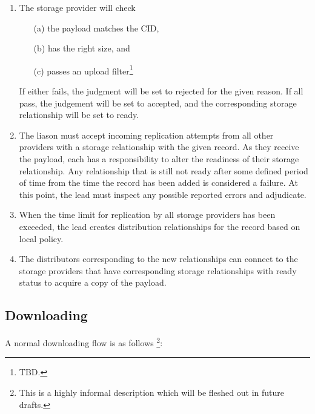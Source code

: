 \documentclass{article}
\begin{document}
\begin{enumerate}
\item
The storage provider will check

      \begin{itemize}

      \item[(a)] the payload matches the CID,

      \item[(b)] has the right size, and

      \item[(c)] passes an upload filter\footnote{TBD.}

      \end{itemize}

If either fails, the judgment will be set to rejected for the given reason. If all pass, the judgement will be set to accepted, and the corresponding storage relationship will be set to ready.

\item
The liason must accept incoming replication attempts from all other providers with a storage relationship with the given record. As they receive the payload, each has a responsibility to alter the readiness of their storage relationship. Any relationship that is still not ready after some defined period of time from the time the record has been added is considered a failure. At this point, the lead must inspect any possible reported errors and adjudicate.

\item
When the time limit for replication by all storage providers has been exceeded, the lead creates distribution relationships for the record based on local policy.

\item
The distributors corresponding to the new relationships can connect to the storage providers that have corresponding storage relationships with ready status to acquire a copy of the payload.

\end{enumerate}

\subsection{Downloading}

A normal downloading flow is as follows \footnote{This is a highly informal description which will be fleshed out in future drafts.}:

\end{document}
